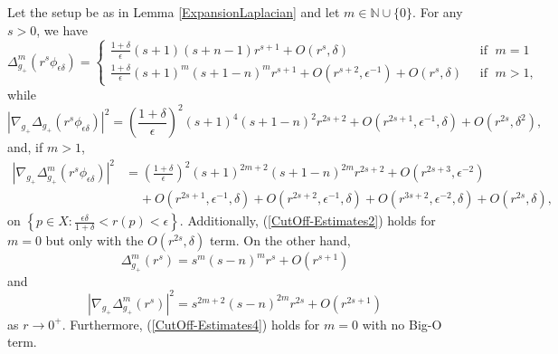 \documentclass{amsart}
\newcommand{\D}{\delta}
\newcommand{\E}{\epsilon}
\begin{document}
\begin{lemma}\label{CutOff-Estimates}
    Let the setup be as in Lemma \ref{ExpansionLaplacian} and let $m\in \mathbb{N}\cup \{0\}$. For any $s>0$, we have
    \begin{equation}\label{CutOff-Estimates1}
        \Delta^m_{g_+}(r^s\phi_{\E\D}) = 
    \begin{cases}
    \frac{1+\D}{\E}(s+1)(s+n-1)r^{s+1} +O(r^s,\D) & \;\text{ if }\;m=1\\
    \frac{1+\D}{\E}(s+1)^m(s+1-n)^mr^{s+1} + O(r^{s+2},\E^{-1}) + O(r^s,\D) &\;\text{ if }\;m>1,
    \end{cases}
    \end{equation}
    while
    \begin{equation}\label{CutOff-Estimates2-1}
         |\nabla_{g_+}\Delta_{g_+}(r^s\phi_{\E\D})|^2 = \left(\frac{1+\D}{\E}\right)^2(s+1)^4(s+1-n)^2r^{2s+2} +O(r^{2s+1},\E^{-1},\D)+O(r^{2s},\D^2),
    \end{equation}
    and, if $m>1$,
    \begin{equation}\label{CutOff-Estimates2}
    \begin{split}
    |\nabla_{g_+}\Delta_{g_+}^m(r^s\phi_{\E\D})|^2 &= \left(\frac{1+\D}{\E}\right)^2(s+1)^{2m+2}(s+1-n)^{2m}r^{2s+2}+O(r^{2s+3},\E^{-2})\\&\;\;\;\;+ O(r^{2s+1},\E^{-1},\D) + O(r^{2s+2},\E^{-1},\D)+O(r^{3s+2},\E^{-2},\D) +O(r^{2s},\D),
    \end{split}
    \end{equation}
    on $\left\{p\in X: \frac{\E\D}{1+\D}<r(p)<\E\right\}$. Additionally, (\ref{CutOff-Estimates2}) holds for $m=0$ but only with the $O(r^{2s},\D)$ term. On the other hand, 
    \begin{equation}\label{CutOff-Estimates3}
       \Delta_{g_+}^m(r^s) = s^m(s-n)^mr^s + O(r^{s+1})
    \end{equation}
    and
    \begin{equation}\label{CutOff-Estimates4}
       |\nabla_{g_+}\Delta^m_{g_+}(r^s)|^2 = s^{2m+2}(s-n)^{2m}r^{2s} + O(r^{2s+1}) 
    \end{equation}
    as $r\to 0^+$. Furthermore, (\ref{CutOff-Estimates4}) holds for $m=0$ with no Big-O term.
\end{lemma}
\end{document}
